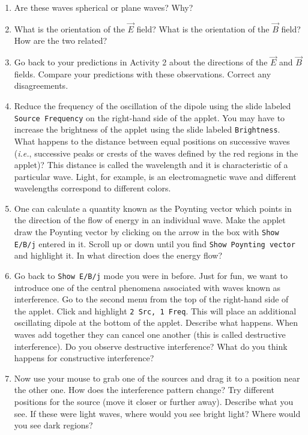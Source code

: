 \begin{enumerate}
\item Are these waves spherical or plane waves? Why?
\vspace{1.5cm}

\item What is the orientation of the $\vec E$ field?
What is the orientation of the $\vec B$ field?
How are the two related?
\vspace{2.0cm}

\item Go back to your predictions in Activity 2 about the directions of the $\vec E$ 
and $\vec B$ fields.
Compare your predictions with these observations. Correct any disagreements.
\vspace{2.0cm}

\item Reduce the frequency of the oscillation of the dipole using the slide labeled
{\tt Source Frequency} on the right-hand side of the applet.
You may have to increase the brightness of the applet using the slide labeled
{\tt Brightness}.
What happens to the distance between equal positions on successive waves
({\it i.e.}, successive peaks or crests of the waves defined by the red regions in the
applet)?
This distance is called the wavelength and it is characteristic of a particular
wave.
Light, for example,  is an electromagnetic wave and different wavelengths correspond 
to different colors.
\vspace{2.0cm}

\item One can calculate a quantity known as the Poynting vector which points in the direction of the flow of energy in an individual wave. Make the applet draw the Poynting vector by clicking on the arrow in the box with 
{\tt Show E/B/j} entered in it. Scroll up or down until you find
{\tt Show Poynting vector} and highlight it.
In what direction does the energy flow?
\vspace{1.0cm}

\item Go back to {\tt Show E/B/j} mode you were in before. 
Just for fun, we want to introduce one of the central phenomena associated
with waves known as interference.
Go to the second menu from the top of the right-hand side of the applet.
Click and highlight {\tt 2 Src, 1 Freq}.
This will place an additional oscillating dipole at the bottom of the applet.
Describe what happens.
When waves add together they can cancel one another (this is called destructive 
interference).
Do you observe destructive interference?
What do you think happens for constructive interference?
\vspace{1.5cm}

\item Now use your mouse to grab one of the sources and drag it to a position
near the other one.
How does the interference pattern change?
Try different positions for the source (move it closer or further away).
Describe what you see.
If these were light waves, where would you see bright light?
Where would you see dark regions?
\vspace{2.0cm}

\end{enumerate}

